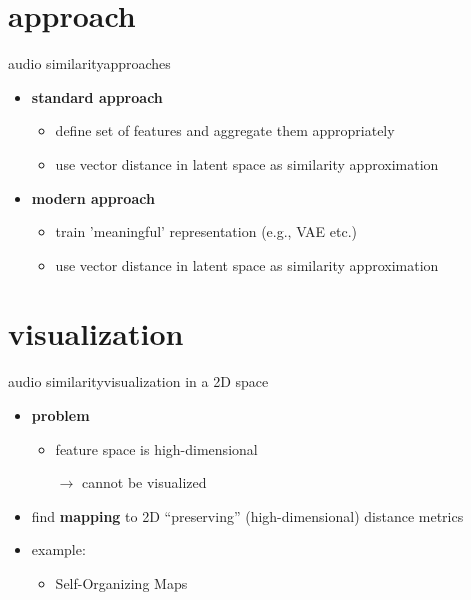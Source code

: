    \section{approach}         
        \begin{frame}{audio similarity}{approaches}
            \begin{itemize}
                \item   \textbf{standard approach}
                    \begin{itemize}
                        \item   define set of features and aggregate them appropriately
                        \item   use vector distance in latent space as similarity approximation
                    \end{itemize}
                \bigskip
                \item   \textbf{modern approach}
                    \begin{itemize}
                        \item   train 'meaningful' representation (e.g., VAE etc.)
                        \item   use vector distance in latent space as similarity approximation
                    \end{itemize}
            \end{itemize}
        \end{frame}

    \section[visual]{visualization}
        \begin{frame}{audio similarity}{visualization in a 2D space}
            \begin{itemize}
                \item \textbf{problem}
                    \begin{itemize}
                        \item   feature space is high-dimensional
                        \item[$\rightarrow$] cannot be visualized
                    \end{itemize}
                \bigskip
                \item<2-> find \textbf{mapping} to 2D ``preserving'' (high-dimensional) distance metrics
                \item<2->[]     example:
                    \begin{itemize}
                        \item   Self-Organizing Maps
                    \end{itemize}
            \end{itemize}
        \end{frame}
            
